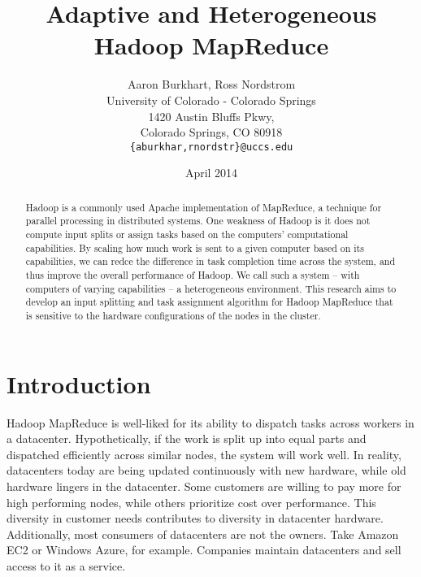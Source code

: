 \documentclass{sig-alternate}
\begin{document}
\title{Adaptive and Heterogeneous Hadoop MapReduce}
\author{Aaron Burkhart, Ross Nordstrom\\
        University of Colorado - Colorado Springs\\
        1420 Austin Bluffs Pkwy,\\
        Colorado Springs, CO 80918\\
        \texttt{\{aburkhar,rnordstr\}@uccs.edu}
       }
\date{April 2014}

\maketitle

\begin{abstract}
Hadoop is a commonly used Apache implementation of MapReduce, a technique for
parallel processing in distributed systems. One weakness of Hadoop is it does
not compute input splits or assign tasks based on the computers’ computational capabilities. By scaling
how much work is sent to a given computer based on its capabilities, we can
redce the difference in task completion time across the system, and thus improve
the overall performance of Hadoop. We call such a system – with computers of
varying capabilities – a heterogeneous environment. This research aims to develop
an input splitting and task assignment algorithm for Hadoop MapReduce that is sensitive 
to the hardware configurations of the nodes in the cluster.
\end{abstract}


\section{Introduction}
Hadoop MapReduce is well-liked for its ability to dispatch tasks across workers
in a datacenter. Hypothetically, if the work is split up into equal parts and dispatched
efficiently across similar nodes, the system will work well. In reality, datacenters today are being
updated continuously with new hardware, while old hardware lingers in the datacenter. 
Some customers are willing to pay more for high performing nodes, while others prioritize cost over
performance. This diversity in customer needs contributes to diversity in datacenter hardware. 
Additionally, most consumers of datacenters are not the owners. Take Amazon EC2
or Windows Azure, for example. Companies maintain datacenters and sell access to
it as a service. 
\end{document}
